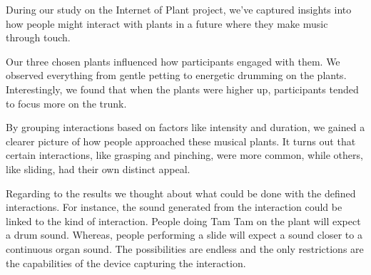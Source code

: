 During our study on the Internet of Plant project, we've captured insights into how people might interact with plants in a future where they make music through touch.

Our three chosen plants influenced how participants engaged with them. We observed everything from gentle petting to energetic drumming on the plants.
Interestingly, we found that when the plants were higher up, participants tended to focus more on the trunk.

By grouping interactions based on factors like intensity and duration, we gained a clearer picture of how people approached these musical plants.
It turns out that certain interactions, like grasping and pinching, were more common, while others, like sliding, had their own distinct appeal.

Regarding to the results we thought about what could be done with the defined interactions.
For instance, the sound generated from the interaction could be linked to the kind of interaction.
People doing Tam Tam on the plant will expect a drum sound. Whereas, people performing a slide will expect a sound closer to a continuous organ sound.
The possibilities are endless and the only restrictions are the capabilities of the device capturing the interaction. 
